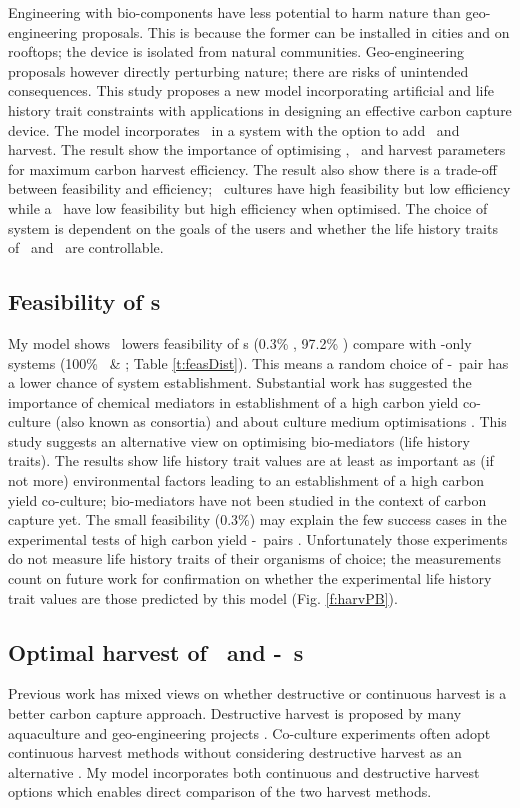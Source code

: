 \documentclass[../thesis.tex]{subfiles} %
\begin{document}
Engineering with bio-components have less potential to harm nature than geo-engineering proposals.  This is because the former can be installed in cities and on rooftops; the device is isolated from natural communities.  Geo-engineering proposals however directly perturbing nature; there are risks of unintended consequences.  This study proposes a new model incorporating artificial and life history trait constraints with applications in designing an effective carbon capture device.  The model incorporates \phy\ in a system with the option to add \bac\ and harvest.  The result show the importance of optimising \phy, \bac\ and harvest parameters for maximum carbon harvest efficiency.  The result also show there is a trade-off between feasibility and efficiency; \phy\ cultures have high feasibility but low efficiency while a \pbs\ have low feasibility but high efficiency when optimised.  The choice of system is dependent on the goals of the users and whether the life history traits of \phy\ and \bac\ are controllable.

\subsection{Feasibility of \pbs s}
My model shows \bac\ lowers feasibility of \pbs s (0.3\% \PBH, 97.2\% \PBN) compare with \phy-only systems (100\% \PoH\ \& \PoN; Table \ref{t:feasDist}).  This means a random choice of \phy-\bac\ pair has a lower chance of system establishment.  Substantial work has suggested the importance of chemical mediators in establishment of a high carbon yield co-culture (also known as consortia) and about culture medium optimisations \autocite{rivas2010interactions,amin2009photolysis,fuentes2016impact}.  This study suggests an alternative view on optimising bio-mediators (life history traits).  The results show life history trait values are at least as important as (if not more) environmental factors leading to an establishment of a high carbon yield co-culture; bio-mediators have not been studied in the context of carbon capture yet.  The small feasibility (0.3\%) may explain the few success cases in the experimental tests of high carbon yield \phy-\bac\ pairs \autocite{fuentes2016impact}.  Unfortunately those experiments do not measure life history traits of their organisms of choice; the measurements count on future work for confirmation on whether the experimental life history trait values are those predicted by this model (Fig. \ref{f:harvPB}).

\subsection{Optimal harvest of \phy\ and \phy-\bac\ \pbs s}
Previous work has mixed views on whether destructive or continuous harvest is a better carbon capture approach.  Destructive harvest is proposed by many aquaculture and geo-engineering projects \autocite{lawrence2014efficiency,krause2016substantial}.  Co-culture experiments often adopt continuous harvest methods without considering destructive harvest as an alternative \autocite{kim2008anaerobic,kazamia2012mutualistic}.  My model incorporates both continuous and destructive harvest options which enables direct comparison of the two harvest methods.
\end{document}
